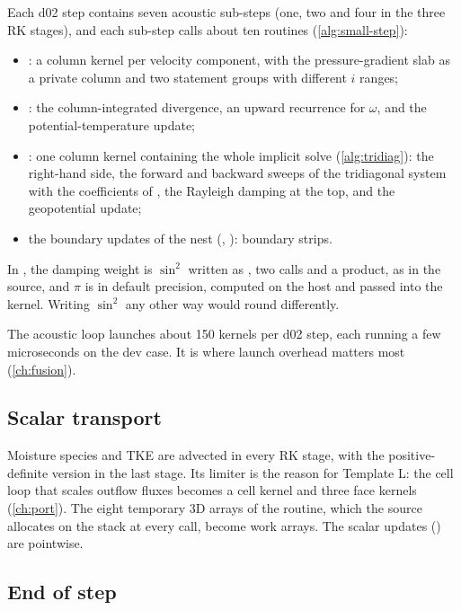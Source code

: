 Each d02 step contains seven acoustic sub-steps (one, two and four in the three RK stages), and each sub-step calls
about ten routines (\cref{alg:small-step}):
\begin{itemize}
  \item {}: a column kernel per velocity component, with the pressure-gradient slab as a private
    column and two statement groups with different $i$ ranges;
  \item {}: the column-integrated divergence, an upward recurrence for $\omega$, and the
    potential-temperature update;
  \item {}: one column kernel containing the whole implicit solve (\cref{alg:tridiag}): the right-hand
    side, the forward and backward sweeps of the tridiagonal system with the coefficients of , the
    Rayleigh damping at the top, and the geopotential update;
  \item the boundary updates of the nest (, ): boundary strips.
\end{itemize}
In , the damping weight is $\sin^2$ written as , two calls and a product,
as in the source, and $\pi$ is  in default precision, computed on the host and passed into the
kernel. Writing $\sin^2$ any other way would round differently.

The acoustic loop launches about 150 kernels per d02 step, each running a few microseconds on the dev case. It is
where launch overhead matters most (\cref{ch:fusion}).

\subsection{Scalar transport}

Moisture species and TKE are advected in every RK stage, with the positive-definite version
 in the last stage. Its limiter is the reason for Template L: the cell loop that scales
outflow fluxes becomes a cell kernel and three face kernels (\cref{ch:port}). The eight temporary 3D arrays of the
routine, which the source allocates on the stack at every call, become work arrays. The scalar updates
() are pointwise.

\subsection{End of step}

